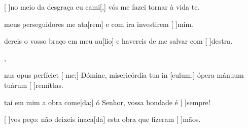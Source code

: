 {    {\item {}[ ]{no} meio da desgraça eu cami[,] vós me fazei tornar à vida te.~\Antiphona
      \item {} meus perseguidores me ata[rem] e com ira investirem [ ]{mim}.~\Antiphona
      \item {}dereis o vosso braço em meu au[lio] e havereis de me salvar com [ ]{des}tra.~\Antiphona},
  {\item {}nus opus perfíciet [ me;] Dómine, misericórdia tua in [culum:] ópera mánuum tuárum [ ]{re}{mít}tas.~\Antiphona}%
    {\item {}tai em mim a obra come[da;] ó Senhor, vossa bondade é [ ]{sem}pre!~\Antiphona
    \item {}[ ]{vos} peço: não deixeis inaca[da] esta obra que fizeram [ ]{mãos}.~\Antiphona}
}